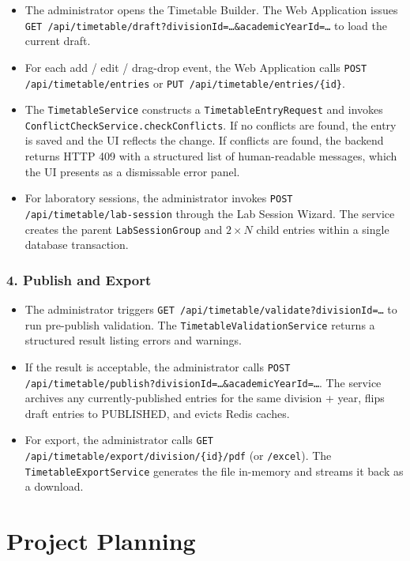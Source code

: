 \begin{itemize}
    \item The administrator opens the Timetable Builder. The Web Application issues \texttt{GET /api/timetable/draft?divisionId=…\&academicYearId=…} to load the current draft.
    \item For each add / edit / drag-drop event, the Web Application calls \texttt{POST /api/timetable/entries} or \texttt{PUT /api/timetable/entries/\{id\}}.
    \item The \texttt{TimetableService} constructs a \texttt{TimetableEntryRequest} and invokes \texttt{ConflictCheckService.checkConflicts}. If no conflicts are found, the entry is saved and the UI reflects the change. If conflicts are found, the backend returns HTTP 409 with a structured list of human-readable messages, which the UI presents as a dismissable error panel.
    \item For laboratory sessions, the administrator invokes \texttt{POST /api/timetable/lab-session} through the Lab Session Wizard. The service creates the parent \texttt{LabSessionGroup} and $2 \times N$ child entries within a single database transaction.
\end{itemize}

\subsubsection{4. Publish and Export}

\begin{itemize}
    \item The administrator triggers \texttt{GET /api/timetable/validate?divisionId=…} to run pre-publish validation. The \texttt{TimetableValidationService} returns a structured result listing errors and warnings.
    \item If the result is acceptable, the administrator calls \texttt{POST /api/timetable/publish?divisionId=…\&academicYearId=…}. The service archives any currently-published entries for the same division + year, flips draft entries to PUBLISHED, and evicts Redis caches.
    \item For export, the administrator calls \texttt{GET /api/timetable/export/division/\{id\}/pdf} (or \texttt{/excel}). The \texttt{TimetableExportService} generates the file in-memory and streams it back as a download.
\end{itemize}

\section{Project Planning}

